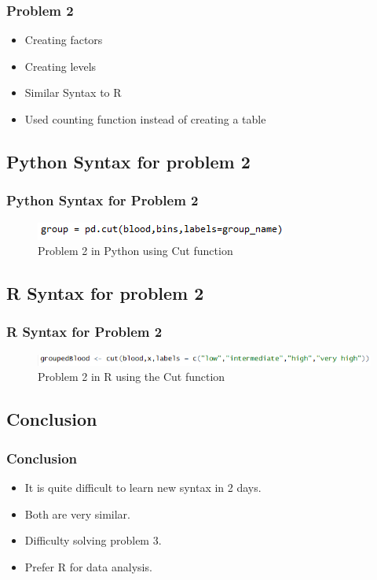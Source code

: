 \documentclass{beamer}
\begin{document}
\begin{frame}
\frametitle{Problem 2}
\begin{itemize}
\setlength\itemsep{3em}
\item Creating factors 
\item Creating levels
\item Similar Syntax to R
\item Used counting function instead of creating a table
\end{itemize}
\end{frame}

\subsection{Python Syntax for problem 2}

\begin{frame}
\frametitle{Python Syntax for Problem 2}
\begin{figure}
\includegraphics[scale=0.9]{PP2.png}
\caption{\label{fig:your-figure}Problem 2 in Python using Cut function} 
\end{figure} 
\end{frame}


\subsection{R Syntax for problem 2}

\begin{frame}
\frametitle{R Syntax for Problem 2}
\begin{figure}
\includegraphics[scale=0.6]{RP2.png}
\caption{\label{fig:your-figure}Problem 2 in R using the Cut function} 
\end{figure} 
\end{frame}


\subsection{Conclusion}

\begin{frame}
\frametitle{Conclusion}
\begin{itemize}
\setlength\itemsep{3em}
\item It is quite difficult to learn new syntax in 2 days.
\item Both are very similar.
\item Difficulty solving problem 3.
\item Prefer R for data analysis.
\end{itemize}
\end{frame}
\end{document}
